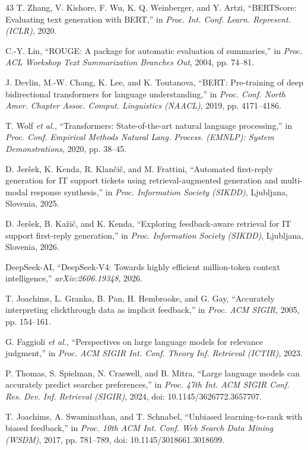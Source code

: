 \documentclass{ieeeaccess}
\begin{document}
\begin{thebibliography}{43}
 T. Zhang, V. Kishore, F. Wu, K. Q. Weinberger, and Y. Artzi, ``BERTScore: Evaluating text generation with BERT,'' in \emph{Proc. Int. Conf. Learn. Represent. (ICLR)}, 2020.

 C.-Y. Lin, ``ROUGE: A package for automatic evaluation of summaries,'' in \emph{Proc. ACL Workshop Text Summarization Branches Out}, 2004, pp. 74--81.

 J. Devlin, M.-W. Chang, K. Lee, and K. Toutanova, ``BERT: Pre-training of deep bidirectional transformers for language understanding,'' in \emph{Proc. Conf. North Amer. Chapter Assoc. Comput. Linguistics (NAACL)}, 2019, pp. 4171--4186.

 T. Wolf \emph{et al.}, ``Transformers: State-of-the-art natural language processing,'' in \emph{Proc. Conf. Empirical Methods Natural Lang. Process. (EMNLP): System Demonstrations}, 2020, pp. 38--45.

 D. Jer\v{s}ek, K. Kenda, R. Klan\v{c}i\v{c}, and M. Frattini, ``Automated first-reply generation for IT support tickets using retrieval-augmented generation and multi-modal response synthesis,'' in \emph{Proc. Information Society (SIKDD)}, Ljubljana, Slovenia, 2025.

 D. Jer\v{s}ek, B. Ka\v{z}i\v{c}, and K. Kenda, ``Exploring feedback-aware retrieval for IT support first-reply generation,'' in \emph{Proc. Information Society (SIKDD)}, Ljubljana, Slovenia, 2026.

 DeepSeek-AI, ``DeepSeek-V4: Towards highly efficient million-token context intelligence,'' \emph{arXiv:2606.19348}, 2026.

 T. Joachims, L. Granka, B. Pan, H. Hembrooke, and G. Gay, ``Accurately interpreting clickthrough data as implicit feedback,'' in \emph{Proc. ACM SIGIR}, 2005, pp. 154--161.

 G. Faggioli \emph{et al.}, ``Perspectives on large language models for relevance judgment,'' in \emph{Proc. ACM SIGIR Int. Conf. Theory Inf. Retrieval (ICTIR)}, 2023.

 P. Thomas, S. Spielman, N. Craswell, and B. Mitra, ``Large language models can accurately predict searcher preferences,'' in \emph{Proc. 47th Int. ACM SIGIR Conf. Res. Dev. Inf. Retrieval (SIGIR)}, 2024, doi: 10.1145/3626772.3657707.

 T. Joachims, A. Swaminathan, and T. Schnabel, ``Unbiased learning-to-rank with biased feedback,'' in \emph{Proc. 10th ACM Int. Conf. Web Search Data Mining (WSDM)}, 2017, pp. 781--789, doi: 10.1145/3018661.3018699.


\end{thebibliography}
\end{document}
